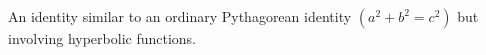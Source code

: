 An identity similar to an ordinary Pythagorean identity $(a^{2}+b^{2}=c^{2})$ 
but involving hyperbolic functions.